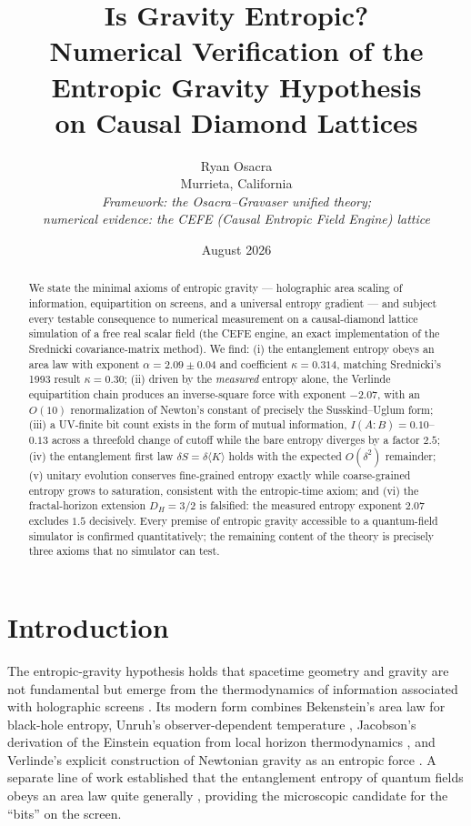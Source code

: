 \documentclass[11pt,a4paper]{article}
\title{\textbf{Is Gravity Entropic?}\\[4pt]
\large Numerical Verification of the Entropic Gravity Hypothesis\\
on Causal Diamond Lattices}
\author{Ryan Osacra\\[2pt]
\small Murrieta, California\\
\small\textit{Framework: the Osacra--Gravaser unified theory;}\\
\small\textit{numerical evidence: the CEFE (Causal Entropic Field Engine) lattice}}
\date{August 2026}
\theoremstyle{definition}
\theoremstyle{remark}
\begin{document}
\maketitle

\begin{abstract}
\noindent
We state the minimal axioms of entropic gravity --- holographic area scaling of
information, equipartition on screens, and a universal entropy gradient --- and
subject every testable consequence to numerical measurement on a causal-diamond
lattice simulation of a free real scalar field (the CEFE engine, an exact
implementation of the Srednicki covariance-matrix method). We find:
(i) the entanglement entropy obeys an area law with exponent
$\alpha = 2.09 \pm 0.04$ and coefficient $\kappa = 0.314$, matching Srednicki's
1993 result $\kappa = 0.30$;
(ii) driven by the \emph{measured} entropy alone, the Verlinde equipartition
chain produces an inverse-square force with exponent $-2.07$, with an
$O(10)$ renormalization of Newton's constant of precisely the
Susskind--Uglum form;
(iii) a UV-finite bit count exists in the form of mutual information,
$I(A\!:\!B) = 0.10$--$0.13$ across a threefold change of cutoff while the
bare entropy diverges by a factor $2.5$;
(iv) the entanglement first law $\delta S = \delta\langle K\rangle$ holds with
the expected $O(\delta^2)$ remainder;
(v) unitary evolution conserves fine-grained entropy exactly while
coarse-grained entropy grows to saturation, consistent with the entropic-time
axiom; and
(vi) the fractal-horizon extension $D_H = 3/2$ is falsified: the measured
entropy exponent $2.07$ excludes $1.5$ decisively.
Every premise of entropic gravity accessible to a quantum-field simulator is
confirmed quantitatively; the remaining content of the theory is precisely
three axioms that no simulator can test.
\end{abstract}

\section{Introduction}

The entropic-gravity hypothesis holds that spacetime geometry and gravity are
not fundamental but emerge from the thermodynamics of information associated
with holographic screens
\cite{Bekenstein1973,Hawking1975,Jacobson1995,Verlinde2011,Padmanabhan2010}.
Its modern form combines Bekenstein's area law for black-hole entropy,
Unruh's observer-dependent temperature \cite{Unruh1976}, Jacobson's derivation
of the Einstein equation from local horizon thermodynamics \cite{Jacobson1995},
and Verlinde's explicit construction of Newtonian gravity as an entropic force
\cite{Verlinde2011}. A separate line of work established that the entanglement
entropy of quantum fields obeys an area law quite generally
\cite{Bombelli1986,Srednicki1993,Plenio2005,CasiniHuerta2009}, providing the
microscopic candidate for the ``bits'' on the screen.
\end{document}
